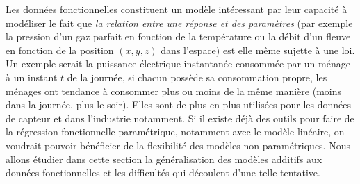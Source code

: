 Les données fonctionnelles constituent un modèle intéressant par leur capacité à modéliser le fait que \emph{la relation entre une réponse et des paramètres} (par exemple la pression d'un gaz parfait en fonction de la température ou la débit d'un fleuve en fonction de la position $(x,y,z)$ dans l'espace) est elle même sujette à une loi. Un exemple serait la puissance électrique instantanée consommée par un ménage à un instant $t$ de la journée, si chacun possède sa consommation propre, les ménages ont tendance à consommer plus ou moins de la même manière (moins dans la journée, plus le soir). Elles sont de plus en plus utilisées pour les données de capteur et dans l'industrie notamment. Si il existe déjà des outils pour faire de la régression fonctionnelle paramétrique, notamment avec le modèle linéaire, on voudrait pouvoir bénéficier de la flexibilité des modèles non paramétriques. Nous allons étudier dans cette section la généralisation des modèles additifs aux données fonctionnelles et les difficultés qui découlent d'une telle tentative.
